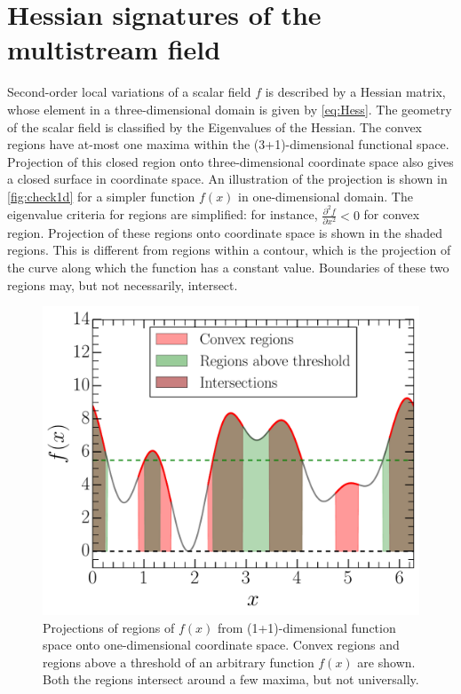 \chapter{Hessian signatures of the multistream field}
\label{appendix:bEigen}

Second-order local variations of a scalar field $f$ is described by a Hessian matrix, whose element in a three-dimensional domain is given by \autoref{eq:Hess}. The geometry of the scalar field is classified by the Eigenvalues of the Hessian. The convex regions have at-most one maxima within the (3+1)-dimensional functional space. Projection of this closed region onto three-dimensional coordinate space also gives a closed surface in coordinate space. An illustration of the projection is shown in \autoref{fig:check1d} for a simpler function $f(x)$ in one-dimensional domain. The eigenvalue criteria for regions are simplified: for instance, $\frac{\partial^2 f}{\partial x^2} < 0$ for convex region. Projection of these regions onto coordinate space is shown in the shaded regions. This is different from regions within a contour, which is the projection of the curve along which the function has a constant value. Boundaries of these two regions may, but not necessarily, intersect. 

\begin{figure}
\begin{minipage}[t]{.99\linewidth}
  \centering\includegraphics[width=8.cm]{Chapter5/Source_v2/fig15.pdf} 
\end{minipage}\hfill
\caption{Projections of regions of $f(x)$ from (1+1)-dimensional function space onto one-dimensional coordinate space. Convex regions and regions above a threshold of an arbitrary function $f(x)$ are shown. Both the regions intersect around a few maxima, but not universally.}
\label{fig:check1d}
\end{figure}

